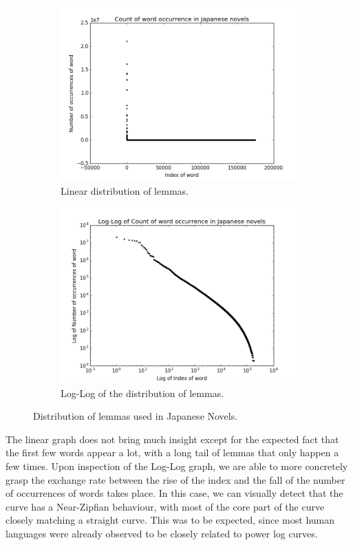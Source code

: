 \begin{figure}[ht]
    \centering
    \begin{subfigure}{0.475\textwidth}
    \centering
    \includegraphics[width=0.9\linewidth]{Cap2/WordCountNovels}
    \caption{Linear distribution of lemmas.}
    \label{fig:lemmalinear}
    \end{subfigure}
    \begin{subfigure}{0.475\textwidth}
    \centering
    \includegraphics[width=0.9\linewidth]{Cap2/LogLogWordCountNovels}
    \caption{Log-Log of the distribution of lemmas.}
    \label{fig:lemmalog}
    \end{subfigure}
    
    \caption{Distribution of lemmas used in Japanese Novels.}
    \label{fig:lemmacount}
\end{figure}

The linear graph does not bring much insight except for the expected fact that the first few words appear a lot, with a long tail of lemmas that only happen a few times. Upon inspection of the Log-Log graph, we are able to more concretely grasp the exchange rate between the rise of the index and the fall of the number of occurrences of words takes place. In this case, we can visually detect that the curve has a Near-Zipfian behaviour, with most of the core part of the curve closely matching a straight curve. This was to be expected, since most human languages were already observed to be closely related to power log curves.

